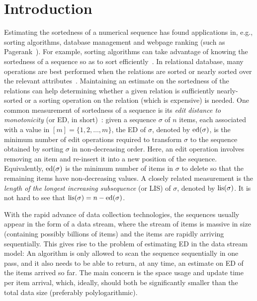 \documentclass{llncs}
\newcommand{\ed}{{\rm ed}}
\newcommand{\lis}{{\rm lis}}
\begin{document}
\section{Introduction}

Estimating the sortedness of a numerical sequence
has found applications in, e.g., sorting algorithms,
database management and webpage ranking (such as Pagerank~\cite{BrP98}).
For example, sorting algorithms can take advantage of
knowing the sortedness of a sequence so as to sort efficiently~\cite{EsW92}.
In relational database, many operations are best performed
when the relations are sorted or nearly sorted over the relevant attributes~\cite{BKF+11}.
Maintaining an estimate on the sortedness of the relations can help determining
whether a given relation is sufficiently nearly-sorted or
a sorting operation on the relation (which is expensive) is needed.
One common measurement of sortedness of a sequence
is its \emph{edit distance to monotonicity} (or ED, in short)~\cite{AJK+02,CMS01,ErJ08,GaG07,GJK+07}:
given a sequence $\sigma$ of $n$ items,
each associated with a value in $[m] = \{1, 2, \dots, m\}$,
the ED of $\sigma$, denoted by $\ed(\sigma)$,
is the minimum number of edit operations required
to transform $\sigma$ to the sequence obtained
by sorting $\sigma$ in non-decreasing order.
Here, an edit operation involves removing an item and re-insert it into a
new position of the sequence.  Equivalently,
$\ed(\sigma)$ is the minimum number of items in $\sigma$ to delete
so that the remaining items have non-decreasing values.
A closely related measurement
is the \emph{length of the longest increasing subsequence} (or LIS) of $\sigma$,
denoted by $\lis(\sigma)$.
It is not hard to see that $\lis(\sigma) = n - \ed(\sigma)$.

With the rapid advance of data collection technologies,
the sequences usually appear in the form of a data stream,
where the stream of items is massive in size (containing possibly billions of items)
and the items are rapidly arriving sequentially.
This gives rise to the problem of estimating ED in the data stream model:
An algorithm is only allowed to scan the sequence sequentially in one pass,
and it also needs to be able to return, at any time,
an estimate on ED of the items arrived so far.
The main concern is the space usage and
update time per item arrival, which, ideally, should
both be significantly smaller than the total data size
(preferably polylogarithmic).
\end{document}
